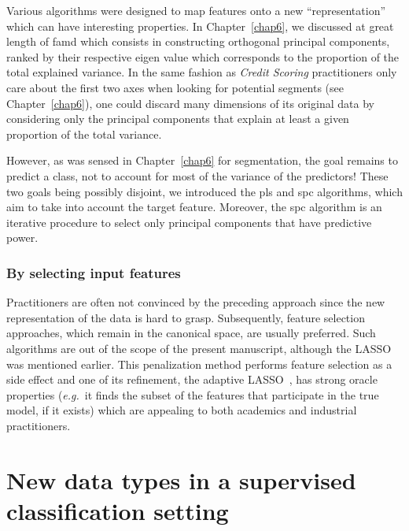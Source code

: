 Various algorithms were designed to map features onto a new ``representation'' which can have interesting properties. In Chapter~\ref{chap6}, we discussed at great length of \gls{famd} which consists in constructing orthogonal principal components, ranked by their respective eigen value which corresponds to the proportion of the total explained variance. In the same fashion as \textit{Credit Scoring} practitioners only care about the first two axes when looking for potential segments (see Chapter~\ref{chap6}), one could discard many dimensions of its original data by considering only the principal components that explain at least a given proportion of the total variance.

However, as was sensed in Chapter~\ref{chap6} for segmentation, the goal remains to predict a class, not to account for most of the variance of the predictors! These two goals being possibly disjoint, we introduced the \gls{pls} and \gls{spc} algorithms, which aim to take into account the target feature. Moreover, the \gls{spc} algorithm is an iterative procedure to select only principal components that have predictive power.


\subsubsection{By selecting input features}

Practitioners are often not convinced by the preceding approach since the new representation of the data is hard to grasp. Subsequently, feature selection approaches, which remain in the canonical space, are usually preferred. Such algorithms are out of the scope of the present manuscript, although the LASSO was mentioned earlier. This penalization method performs feature selection as a side effect and one of its refinement, the adaptive LASSO~\cite{zou2006adaptive}, has strong oracle properties (\textit{e.g.}\ it finds the subset of the features that participate in the true model, if it exists) which are appealing to both academics and industrial practitioners.

\section{New data types in a supervised classification setting}

